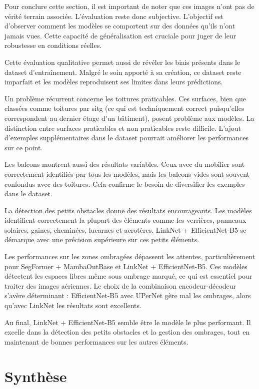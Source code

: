 Pour conclure cette section, il est important de noter que ces images n'ont pas de vérité terrain associée. L'évaluation reste donc subjective. L'objectif est d'observer comment les modèles se comportent sur des données qu'ils n'ont jamais vues. Cette capacité de généralisation est cruciale pour juger de leur robustesse en conditions réelles.

Cette évaluation qualitative permet aussi de révéler les biais présents dans le dataset d'entraînement. Malgré le soin apporté à sa création, ce dataset reste imparfait et les modèles reproduisent ses limites dans leurs prédictions.

Un problème récurrent concerne les toitures praticables. Ces surfaces, bien que classées comme toitures par \acrshort{sitg} (ce qui est techniquement correct puisqu'elles correspondent au dernier étage d'un bâtiment), posent problème aux modèles. La distinction entre surfaces praticables et non praticables reste difficile. L'ajout d'exemples supplémentaires dans le dataset pourrait améliorer les performances sur ce point.

Les balcons montrent aussi des résultats variables. Ceux avec du mobilier sont correctement identifiés par tous les modèles, mais les balcons vides sont souvent confondus avec des toitures. Cela confirme le besoin de diversifier les exemples dans le dataset.

La détection des petits obstacles donne des résultats encourageants. Les modèles identifient correctement la plupart des éléments comme les verrières, panneaux solaires, gaines, cheminées, lucarnes et acrotères. LinkNet + EfficientNet-B5 se démarque avec une précision supérieure sur ces petits éléments.

Les performances sur les zones ombragées dépassent les attentes, particulièrement pour SegFormer + MambaOutBase et LinkNet + EfficientNet-B5. Ces modèles détectent les espaces libres même sous ombrage marqué, ce qui est essentiel pour traiter des images aériennes. Le choix de la combinaison encodeur-décodeur s'avère déterminant : EfficientNet-B5 avec UPerNet gère mal les ombrages, alors qu'avec LinkNet les résultats sont excellents.

Au final, LinkNet + EfficientNet-B5 semble être le modèle le plus performant. Il excelle dans la détection des petits obstacles et la gestion des ombrages, tout en maintenant de bonnes performances sur les autres éléments.


\section{Synthèse}

